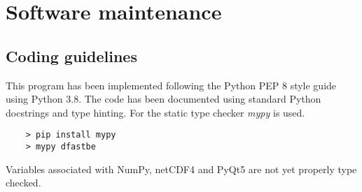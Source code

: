 \chapter{Software maintenance}

\section{Coding guidelines}

This program has been implemented following the Python PEP 8 style guide using Python 3.8.
The code has been documented using standard Python docstrings and type hinting.
For the static type checker \emph{mypy} is used.

\begin{Verbatim}
    > pip install mypy
    > mypy dfastbe
\end{Verbatim}

Variables associated with NumPy, netCDF4 and PyQt5 are not yet properly type checked.

